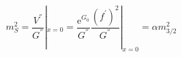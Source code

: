 \begin{equation}\label{ms}
m_{S}^{2} = \frac{V^{''}}{G^{''}}|_{x = 0}  =
\frac{\mathrm{e}^{G_{0}}}{G^{''}}
\frac{(f^{'})^{2}}{G^{''}}|_{x=0} = \alpha m_{3/2}^{2}
\end{equation}

